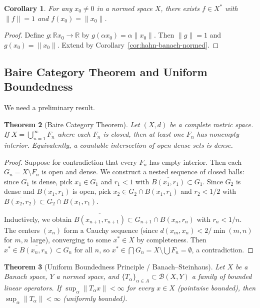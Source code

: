 \documentclass[11pt,a4paper]{article}
\theoremstyle{definition}
\theoremstyle{plain}
\newtheorem{theorem}{Theorem}[section]
\newtheorem{corollary}[theorem]{Corollary}
\theoremstyle{remark}
\newcommand{\R}{\mathbb{R}}
\begin{document}
\begin{corollary}\label{cor:hahn-banach-separation}
For any $x_0 \neq 0$ in a normed space $X$, there exists $f \in X^*$ with
$\|f\| = 1$ and $f(x_0) = \|x_0\|$.
\end{corollary}

\begin{proof}
Define $g \colon \R x_0 \to \R$ by $g(\alpha x_0) = \alpha \|x_0\|$.
Then $\|g\| = 1$ and $g(x_0) = \|x_0\|$.
Extend by Corollary~\ref{cor:hahn-banach-normed}.
\end{proof}

\subsection{Baire Category Theorem and Uniform Boundedness}

We need a preliminary result.

\begin{theorem}[Baire Category Theorem]\label{thm:baire}
Let $(X, d)$ be a complete metric space. If $X = \bigcup_{n=1}^\infty F_n$
where each $F_n$ is closed, then at least one $F_n$ has nonempty interior.
Equivalently, a countable intersection of open dense sets is dense.
\end{theorem}

\begin{proof}
Suppose for contradiction that every $F_n$ has empty interior. Then each
$G_n = X \setminus F_n$ is open and dense. We construct a nested sequence of
closed balls: since $G_1$ is dense, pick $x_1 \in G_1$ and $r_1 < 1$ with
$\overline{B(x_1, r_1)} \subset G_1$. Since $G_2$ is dense and
$B(x_1, r_1)$ is open, pick $x_2 \in G_2 \cap B(x_1, r_1)$ and $r_2 < 1/2$
with $\overline{B(x_2, r_2)} \subset G_2 \cap B(x_1, r_1)$.

Inductively, we obtain $\overline{B(x_{n+1}, r_{n+1})} \subset G_{n+1}
\cap B(x_n, r_n)$ with $r_n < 1/n$. The centers $(x_n)$ form a Cauchy
sequence (since $d(x_m, x_n) < 2/\min(m,n)$ for $m, n$ large), converging
to some $x^* \in X$ by completeness. Then $x^* \in \overline{B(x_n, r_n)}
\subset G_n$ for all $n$, so $x^* \in \bigcap G_n = X \setminus \bigcup F_n
= \emptyset$, a contradiction.
\end{proof}

\begin{theorem}[Uniform Boundedness Principle / Banach--Steinhaus]\label{thm:ubp}
Let $X$ be a Banach space, $Y$ a normed space, and
$\{T_\alpha\}_{\alpha \in A} \subset \mathcal{B}(X, Y)$ a family of bounded
linear operators. If $\sup_\alpha \|T_\alpha x\| < \infty$ for every $x \in X$
(pointwise bounded), then $\sup_\alpha \|T_\alpha\| < \infty$ (uniformly bounded).
\end{theorem}
\end{document}
